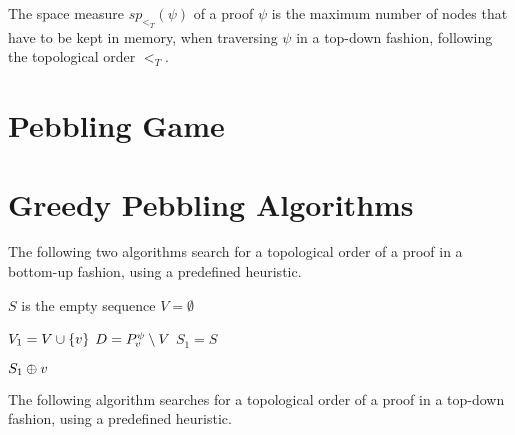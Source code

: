 \documentclass{llncs}
\begin{document}
\begin{definition}
\label{def:space measure}
The space measure $sp_{<_T}(\psi)$ of a proof $\psi$ is the maximum number of nodes that have to be kept in memory, when traversing $\psi$ in a top-down fashion, following the topological order $<_T$.
\end{definition}

\section{Pebbling Game}

\section{Greedy Pebbling Algorithms}

The following two algorithms search for a topological order of a proof in a bottom-up fashion, using a predefined heuristic.


\begin{algorithm}[h]
  \BlankLine

	$S$ is the empty sequence\;
	$V = \emptyset$\;
	\Return {}\;

  \caption[.]{}
  \label{algo:BUpebbling}
\end{algorithm}

\begin{algorithm}[h]
	
	$V_1 = V \cup \{v\}$\;
	$D = P_{v}^{\psi} \setminus V$\;
	$S_1 = S$
	
	
	\Return $S_1 \oplus v$\;
	
  \caption[.]{}
  \label{algo:visit}
\end{algorithm}

The following algorithm searches for a topological order of a proof in a top-down fashion, using a predefined heuristic.
\end{document}

